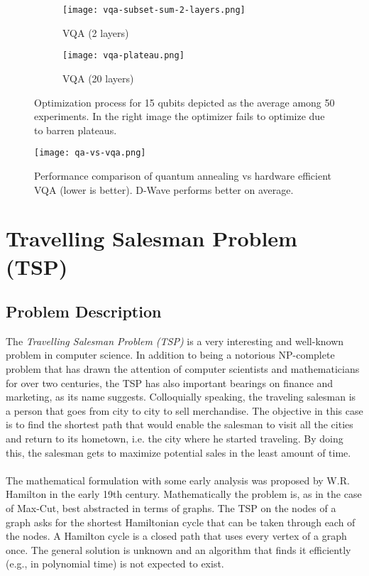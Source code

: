 \documentclass[12pt,a4paper]{report}
\begin{document}
\begin{figure}[h]
    \centering
    \begin{subfigure}[b]{0.45\textwidth}
        \texttt{[image: vqa-subset-sum-2-layers.png]}
        \caption{VQA (2 layers)}
        \label{subfig:vqa_2_layers}
    \end{subfigure}
    \hfill %
    \begin{subfigure}[b]{0.45\textwidth}
        \texttt{[image: vqa-plateau.png]}
        \caption{VQA (20 layers)}
        \label{subfig:vqa_barren_plateau}
    \end{subfigure}
    \caption{Optimization process for 15 qubits depicted as the average among 50 experiments. In the right image the optimizer fails to optimize due to barren plateaus.}
    \label{fig:optimized_results}
\end{figure}


\FloatBarrier
\begin{figure}[H]
\centering
    \texttt{[image: qa-vs-vqa.png]}
    \caption{Performance comparison of quantum annealing vs hardware efficient VQA (lower is better). D-Wave performs better on average.}
    \label{fig:qa_vs_vqa}
\end{figure}
\FloatBarrier

\newpage

\section{Travelling Salesman Problem (TSP)}

\subsection{Problem Description}

The \textit{Travelling Salesman Problem (TSP)} is a very interesting and well-known problem in computer science. In addition to being a notorious NP-complete problem that has drawn the attention of computer scientists and mathematicians for over two centuries, the TSP has also important bearings on finance and marketing, as its name suggests. Colloquially speaking, the traveling salesman is a person that goes from city to city to sell merchandise. The objective in this case is to find the shortest path that would enable the salesman to visit all the cities and return to its hometown, i.e. the city where he started traveling. By doing this, the salesman gets to maximize potential sales in the least amount of time.
\\
\\
\noindent
The mathematical formulation with some early analysis was proposed by W.R. Hamilton in the early 19th century. Mathematically the problem is, as in the case of Max-Cut, best abstracted in terms of graphs. The TSP on the nodes of a graph asks for the shortest Hamiltonian cycle that can be taken through each of the nodes. A Hamilton cycle is a closed path that uses every vertex of a graph once. The general solution is unknown and an algorithm that finds it efficiently (e.g., in polynomial time) is not expected to exist.
\\
\end{document}
